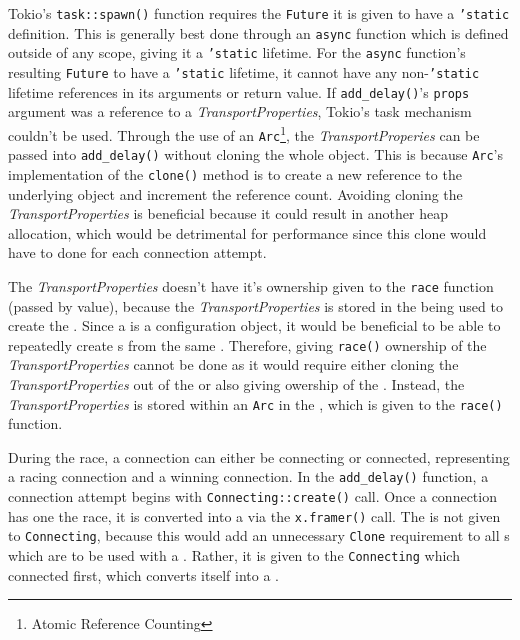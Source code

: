Tokio's \texttt{task::spawn()} function requires the \texttt{Future} it is given to have a \texttt{'static} definition.
This is generally best done through an \texttt{async} function which is defined outside of any scope, giving it a
\texttt{'static} lifetime.
For the \texttt{async} function's resulting \texttt{Future} to have a \texttt{'static} lifetime, it cannot have any
non-\texttt{'static} lifetime references in its arguments or return value.
If \texttt{add\_delay()}'s \texttt{props} argument was a reference to a \emph{TransportProperties}, Tokio's task
mechanism couldn't be used.
Through the use of an \texttt{Arc}\footnote{Atomic Reference Counting}, the \emph{TransportProperies} can be passed into
\texttt{add\_delay()} without cloning the whole object.
This is because \texttt{Arc}'s implementation of the \texttt{clone()} method is to create a new reference to the
underlying object and increment the reference count.
Avoiding cloning the \emph{TransportProperties} is beneficial because it could result in another heap allocation, which
would be detrimental for performance since this clone would have to done for each connection attempt.

The \emph{TransportProperties} doesn't have it's ownership given to the \texttt{race} function (passed by value),
because the \emph{TransportProperties} is stored in the \preconnection{} being used to create the \connection{}.
Since a \preconnection{} is a configuration object, it would be beneficial to be able to repeatedly create
\connection{}s from the same \preconnection{}.
Therefore, giving \texttt{race()} ownership of the \emph{TransportProperties} cannot be done as it would require
either cloning the \emph{TransportProperties} out of the \preconnection{} or also giving owership of the
\preconnection{}.
Instead, the \emph{TransportProperties} is stored within an \texttt{Arc} in the \preconnection{}, which is given to the
\texttt{race()} function.

During the race, a connection can either be connecting or connected, representing a racing connection and a winning
connection.
In the \texttt{add\_delay()} function, a connection attempt begins with \texttt{Connecting::create()} call.
Once a connection has one the race, it is converted into a \connection{} via the \texttt{x.framer()} call.
The \framer{} is not given to \texttt{Connecting}, because this would add an unnecessary \texttt{Clone} requirement to
all \framer{}s which are to be used with a \connection{}.
Rather, it is given to the \texttt{Connecting} which connected first, which converts itself into a \connection{}.

